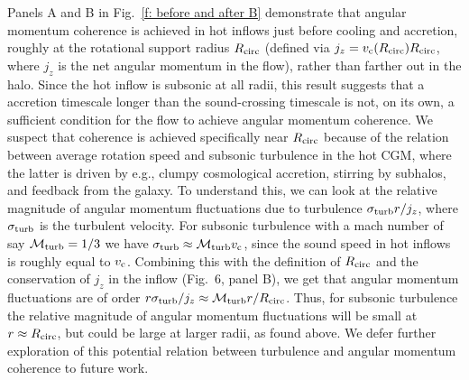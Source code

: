 \documentclass[fleqn,usenatbib]{mnras}
\newcommand{\Rcirc}[0]{R_{\rm circ}}
\newcommand{\vc}[0]{v_{\rm c}}
\newcommand{\mturb}[0]{\mathcal{M}_{\rm turb}}
\begin{document}
Panels A and B in Fig.~\ref{f: before and after B} demonstrate that angular momentum coherence is achieved in hot inflows just before cooling and accretion, roughly at the rotational support radius $\Rcirc$ (defined via $j_z=\vc(\Rcirc)\Rcirc$, where $j_z$ is the net angular momentum in the flow),  rather than farther out in the halo.
Since the hot inflow is subsonic at all radii, this result suggests that a accretion timescale longer than the sound-crossing timescale is not, on its own, a sufficient condition for the flow to achieve angular momentum coherence.
We suspect that coherence is achieved specifically near $\Rcirc$ because of the relation between average rotation speed and subsonic turbulence in the hot CGM, where the latter is driven by e.g., clumpy cosmological accretion, stirring by subhalos, and feedback from the galaxy.
To understand this, we can look at the relative magnitude of angular momentum fluctuations due to turbulence $\sigma_{\rm turb} r / j_z$, where $\sigma_{\rm turb}$ is the turbulent velocity.
For subsonic turbulence with a mach number of say $\mturb=1/3$ we have $\sigma_{\rm turb}\approx \mturb\vc$, since the sound speed in hot inflows is roughly equal to $\vc$.
Combining this with the definition of $\Rcirc$ and the conservation of $j_z$ in the inflow (Fig.~6, panel B), we get that angular momentum fluctuations are of order $r \sigma_{\rm turb}/j_z \approx \mturb r/ \Rcirc$.
Thus, for subsonic turbulence the relative magnitude of angular momentum fluctuations will be small at $r\approx\Rcirc$, but could be large at larger radii, as found above.
We defer further exploration of this potential relation between turbulence and angular momentum coherence to future work. 
\end{document}
